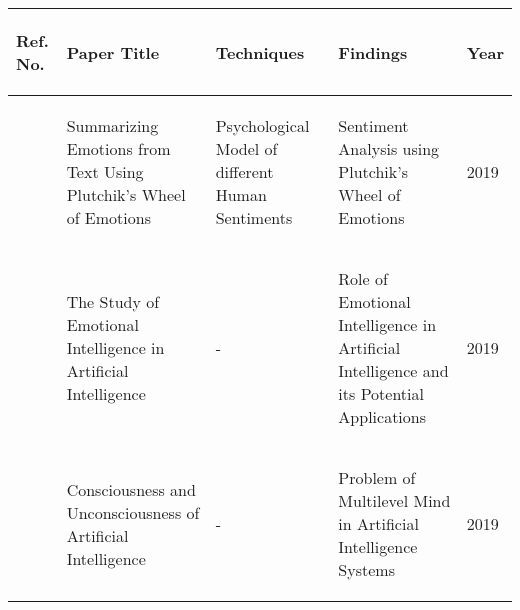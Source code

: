 \begin{tabularx}{\columnwidth}{|X|X|X|X|X|}
	\hline
	\begin{center}\textbf{Ref. No.}\end{center} & \begin{center}\textbf{Paper Title}\end{center} & \begin{center}\textbf{Techniques}\end{center} & \begin{center}\textbf{Findings}\end{center} & \begin{center}\textbf{Year}\end{center}\\
	\hline
	\begin{center}\cite{article3}\end{center} & \begin{center}Summarizing Emotions from Text Using Plutchik's Wheel of Emotions\end{center} & \begin{center}Psychological Model of different Human Sentiments\end{center} & \begin{center}Sentiment Analysis using Plutchik’s Wheel of Emotions\end{center} & \begin{center}2019\end{center}\\
	\hline
	\begin{center}\cite{ISSN-2456-2165}\end{center} & \begin{center}The Study of Emotional Intelligence in	Artificial Intelligence\end{center} & \begin{center}-\end{center} & \begin{center}Role of Emotional Intelligence in Artificial Intelligence and its Potential Applications\end{center} & \begin{center}2019\end{center}\\
	\hline
	\begin{center}\cite{article4}\end{center} & \begin{center}Consciousness and Unconsciousness of Artificial Intelligence\end{center} & \begin{center}-\end{center} & \begin{center}Problem of Multilevel Mind in Artificial Intelligence Systems\end{center} & \begin{center}2019\end{center}\\

\end{tabularx}
